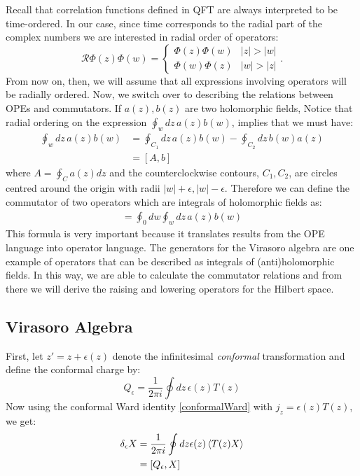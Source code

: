 \documentclass{report}
\theoremstyle{plain}
\theoremstyle{definition}
\theoremstyle{remark}
\newcommand{\FR}[2]{\frac{#1}{#2}}
\newcommand{\mc}{\mathcal}
\begin{document}
Recall that correlation functions defined in QFT are always interpreted to
be time-ordered. In our case, since time corresponds to the radial part of
the complex numbers we are interested in radial order of operators:
\[ \mc R \Phi(z)\Phi(w) = \begin{cases} \Phi(z)\Phi(w)& |z|> |w|\\
\Phi(w)\Phi(z) &|w|>|z|\end{cases}.\]
From now on, then, we will assume that all expressions involving operators
will be radially ordered. Now, we switch over to describing the relations
between OPEs and commutators. If $a(z), b(z)$ are two holomorphic fields,
Notice that radial ordering on the expression $\oint_w dz\, a(z)b(w)$,
implies that we must have:
\begin{align*}
    \oint_w dz\, a(z)b(w) &= \oint_{C_1} dz\, a(z)b(w) - \oint_{C_2} dz\,
    b(w)a(z)\\
    &= [A,b]
\end{align*}
where $A = \oint_C a(z)dz$ and the counterclockwise contours, $C_1,C_2$,
are circles centred around the origin with radii $|w| + \epsilon, |w| 
-\epsilon$. Therefore we can define the commutator of two operators which
are integrals of holomorphic fields as:
\begin{align}
    [A,B] = \oint_0 dw \oint_w dz\, a(z)b(w)
    \label{commutatorscountourintegral}
\end{align}
This formula is very important because it translates results from the OPE
language into operator language. The generators for the Virasoro algebra
are one example of operators that can be described as integrals of
(anti)holomorphic fields. In this way, we are able to calculate the
commutator relations and from there we will derive the raising and lowering
operators for the Hilbert space.

\subsection{Virasoro Algebra}
First, let $z' = z+\epsilon(z)$
denote the infinitesimal \emph{conformal} transformation and define the
conformal charge by:
\[ Q_\epsilon = \FR{1}{2\pi i}\oint dz\, \epsilon(z) T(z) \]
Now using the conformal Ward identity \eqref{conformalWard} with $j_z =
\epsilon(z) T(z)$, we get:
\begin{align*}
\delta_\epsilon X &= \FR{1}{2\pi i}\oint dz \epsilon(z) \braket{T(z)X}\\
&= [Q_\epsilon,X]
\end{align*}
\end{document}
